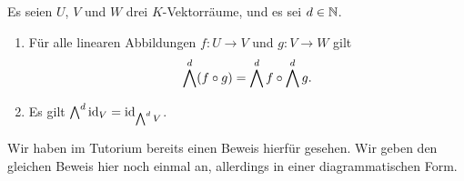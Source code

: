 \begin{proposition}
  \label{proposition: functoriality of exterior power}
  Es seien $U$, $V$ und $W$ drei $K$-Vektorräume, und es sei $d \in \mathbb{N}$.
  \begin{enumerate}
    \item
      Für alle linearen Abbildungen $f \colon U \to V$ und $g \colon V \to W$ gilt
      \[
          \bigwedge^{d} (f \circ g)
        = \bigwedge^{d} f \circ \bigwedge^{d} g.
      \]
    \item
      Es gilt $\bigwedge^{d}  \operatorname{id}_V = \operatorname{id}_{\bigwedge^{d} V}$.
  \end{enumerate}
\end{proposition}

Wir haben im Tutorium bereits einen Beweis hierfür gesehen.
Wir geben den gleichen Beweis hier noch einmal an, allerdings in einer diagrammatischen Form.

